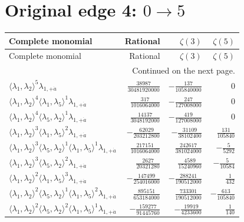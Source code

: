 \section{Original edge 4: $0\to 5$}
\begin{longtable}{@{}lrrr@{}}
\toprule
Complete monomial & Rational & $\zeta(3)$ & $\zeta(5)$ \\
\midrule\endfirsthead
\toprule Complete monomial & Rational & $\zeta(3)$ & $\zeta(5)$ \\
\midrule\endhead
\midrule\multicolumn{4}{r}{Continued on the next page.}\\\endfoot
\bottomrule\endlastfoot
$\langle\lambda_1,\lambda_2\rangle^{5}\lambda_{1,+\dot a}$ & $\frac{38987}{30481920000}$ & $-\frac{137}{105840000}$ & $0$ \\
$\langle\lambda_1,\lambda_2\rangle^{4}\langle\lambda_1,\lambda_5\rangle^{1}\lambda_{1,+\dot a}$ & $\frac{317}{1016064000}$ & $-\frac{247}{127008000}$ & $0$ \\
$\langle\lambda_1,\lambda_2\rangle^{4}\langle\lambda_5,\lambda_2\rangle^{1}\lambda_{1,+\dot a}$ & $\frac{14137}{3048192000}$ & $-\frac{419}{127008000}$ & $0$ \\
$\langle\lambda_1,\lambda_2\rangle^{3}\langle\lambda_1,\lambda_5\rangle^{2}\lambda_{1,+\dot a}$ & $-\frac{62029}{203212800}$ & $-\frac{31109}{38102400}$ & $\frac{131}{105840}$ \\
$\langle\lambda_1,\lambda_2\rangle^{3}\langle\lambda_5,\lambda_2\rangle^{1}\langle\lambda_1,\lambda_5\rangle^{1}\lambda_{1,+\dot a}$ & $\frac{217151}{1016064000}$ & $\frac{242617}{381024000}$ & $-\frac{5}{5292}$ \\
$\langle\lambda_1,\lambda_2\rangle^{3}\langle\lambda_5,\lambda_2\rangle^{2}\lambda_{1,+\dot a}$ & $\frac{2627}{20321280}$ & $\frac{4589}{15240960}$ & $-\frac{5}{10584}$ \\
$\langle\lambda_1,\lambda_2\rangle^{2}\langle\lambda_1,\lambda_5\rangle^{3}\lambda_{1,+\dot a}$ & $-\frac{147499}{254016000}$ & $-\frac{288241}{190512000}$ & $\frac{1}{432}$ \\
$\langle\lambda_1,\lambda_2\rangle^{2}\langle\lambda_5,\lambda_2\rangle^{1}\langle\lambda_1,\lambda_5\rangle^{2}\lambda_{1,+\dot a}$ & $\frac{895151}{653184000}$ & $\frac{733301}{190512000}$ & $-\frac{613}{105840}$ \\
$\langle\lambda_1,\lambda_2\rangle^{2}\langle\lambda_5,\lambda_2\rangle^{2}\langle\lambda_1,\lambda_5\rangle^{1}\lambda_{1,+\dot a}$ & $-\frac{159277}{91445760}$ & $-\frac{19919}{4233600}$ & $\frac{1}{140}$ \\

\end{longtable}
